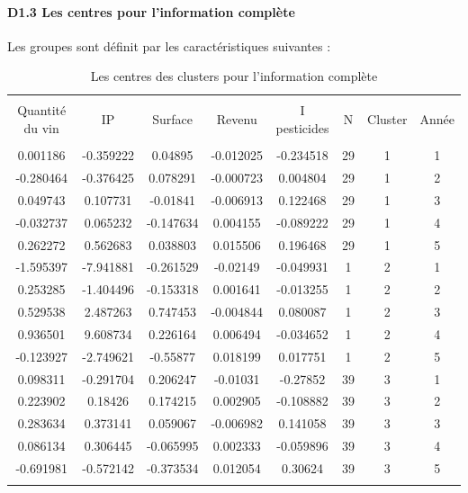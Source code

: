 \documentclass[11pt,]{article}
\let\oldparagraph\paragraph
\renewcommand{\paragraph}[1]{\oldparagraph{#1}\mbox{}}
\begin{document}
\FloatBarrier

\newpage

\hypertarget{d1.3-les-centres-pour-linformation-complete}{%
\paragraph{D1.3 Les centres pour l'information
complète}\label{d1.3-les-centres-pour-linformation-complete}}

Les groupes sont définit par les caractéristiques suivantes :

\FloatBarrier

\begin{table}[!htbp] \centering 
  \caption{Les centres des clusters pour l'information complète} 
  \label{} 
\begin{tabular}{@{\extracolsep{5pt}} cccccccc} 
\\[-1.8ex]\hline 
\hline \\[-1.8ex] 
Quantité du vin & IP & Surface & Revenu & I pesticides & N & Cluster & Année \\ 
\hline \\[-1.8ex] 
0.001186 & -0.359222 & 0.04895 & -0.012025 & -0.234518 & 29 & 1 & 1 \\ 
-0.280464 & -0.376425 & 0.078291 & -0.000723 & 0.004804 & 29 & 1 & 2 \\ 
0.049743 & 0.107731 & -0.01841 & -0.006913 & 0.122468 & 29 & 1 & 3 \\ 
-0.032737 & 0.065232 & -0.147634 & 0.004155 & -0.089222 & 29 & 1 & 4 \\ 
0.262272 & 0.562683 & 0.038803 & 0.015506 & 0.196468 & 29 & 1 & 5 \\ 
-1.595397 & -7.941881 & -0.261529 & -0.02149 & -0.049931 & 1 & 2 & 1 \\ 
0.253285 & -1.404496 & -0.153318 & 0.001641 & -0.013255 & 1 & 2 & 2 \\ 
0.529538 & 2.487263 & 0.747453 & -0.004844 & 0.080087 & 1 & 2 & 3 \\ 
0.936501 & 9.608734 & 0.226164 & 0.006494 & -0.034652 & 1 & 2 & 4 \\ 
-0.123927 & -2.749621 & -0.55877 & 0.018199 & 0.017751 & 1 & 2 & 5 \\ 
0.098311 & -0.291704 & 0.206247 & -0.01031 & -0.27852 & 39 & 3 & 1 \\ 
0.223902 & 0.18426 & 0.174215 & 0.002905 & -0.108882 & 39 & 3 & 2 \\ 
0.283634 & 0.373141 & 0.059067 & -0.006982 & 0.141058 & 39 & 3 & 3 \\ 
0.086134 & 0.306445 & -0.065995 & 0.002333 & -0.059896 & 39 & 3 & 4 \\ 
-0.691981 & -0.572142 & -0.373534 & 0.012054 & 0.30624 & 39 & 3 & 5 \\ 
\hline \\[-1.8ex] 
\end{tabular} 
\end{table}
\end{document}

